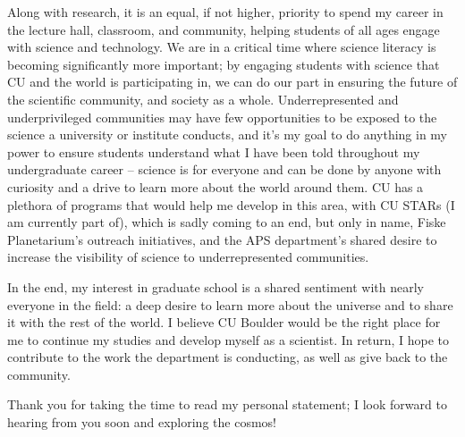 \documentclass[11pt,letterpaper]{article}
\begin{document}
Along with research, it is an equal, if not higher, priority to spend my career in the lecture hall, classroom, and community, helping students of all ages engage with science and technology. We are in a critical time where science literacy is becoming significantly more important; by engaging students with science that CU and the world is participating in, we can do our part in ensuring the future of the scientific community, and society as a whole. Underrepresented and underprivileged communities may have few opportunities to be exposed to the science a university or institute conducts, and it’s my goal to do anything in my power to ensure students understand what I have been told throughout my undergraduate career -- science is for everyone and can be done by anyone with curiosity and a drive to learn more about the world around them. CU has a plethora of programs that would help me develop in this area, with CU STARs (I am currently part of), which is sadly coming to an end, but only in name, Fiske Planetarium's outreach initiatives, and the APS department's shared desire to increase the visibility of science to underrepresented communities.
  
In the end, my interest in graduate school is a shared sentiment with nearly everyone in the field: a deep desire to learn more about the universe and to share it with the rest of the world. I believe CU Boulder would be the right place for me to continue my studies and develop myself as a scientist. In return, I hope to contribute to the work the department is conducting, as well as give back to the community.

Thank you for taking the time to read my personal statement; I look forward to hearing from you soon and exploring the cosmos!
\end{document}

